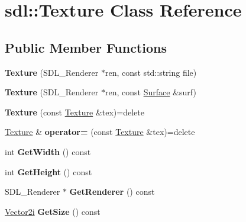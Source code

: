 \hypertarget{classsdl_1_1Texture}{\section{sdl\-:\-:Texture Class Reference}
\label{classsdl_1_1Texture}
}
\subsection*{Public Member Functions}
\begin{DoxyCompactItemize}
\item 
\hypertarget{classsdl_1_1Texture_aafbb2d903a685ce2093468ae618ac08d}{{\bfseries Texture} (S\-D\-L\-\_\-\-Renderer $\ast$ren, const std\-::string file)}\label{classsdl_1_1Texture_aafbb2d903a685ce2093468ae618ac08d}

\item 
\hypertarget{classsdl_1_1Texture_aa611d232626f15699711bbd9f8621f97}{{\bfseries Texture} (S\-D\-L\-\_\-\-Renderer $\ast$ren, const \hyperlink{classsdl_1_1Surface}{Surface} \&surf)}\label{classsdl_1_1Texture_aa611d232626f15699711bbd9f8621f97}

\item 
\hypertarget{classsdl_1_1Texture_a9ef8fc4562712b6b4bc8e3b54bd7a66b}{{\bfseries Texture} (const \hyperlink{classsdl_1_1Texture}{Texture} \&tex)=delete}\label{classsdl_1_1Texture_a9ef8fc4562712b6b4bc8e3b54bd7a66b}

\item 
\hypertarget{classsdl_1_1Texture_a55c8e99d500b331a0ad4e5e97c1b2cfc}{\hyperlink{classsdl_1_1Texture}{Texture} \& {\bfseries operator=} (const \hyperlink{classsdl_1_1Texture}{Texture} \&tex)=delete}\label{classsdl_1_1Texture_a55c8e99d500b331a0ad4e5e97c1b2cfc}

\item 
\hypertarget{classsdl_1_1Texture_af59bd68b996858bde68cb5cbb08e30fe}{int {\bfseries Get\-Width} () const }\label{classsdl_1_1Texture_af59bd68b996858bde68cb5cbb08e30fe}

\item 
\hypertarget{classsdl_1_1Texture_a53a9ba9261c1f309d814a0a5af42a107}{int {\bfseries Get\-Height} () const }\label{classsdl_1_1Texture_a53a9ba9261c1f309d814a0a5af42a107}

\item 
\hypertarget{classsdl_1_1Texture_a0167d59afbd3ad3c11fa289285670ddf}{S\-D\-L\-\_\-\-Renderer $\ast$ {\bfseries Get\-Renderer} () const }\label{classsdl_1_1Texture_a0167d59afbd3ad3c11fa289285670ddf}

\item 
\hypertarget{classsdl_1_1Texture_adfc0037b99bb9b0926cc84219affd5d4}{\hyperlink{classsdl_1_1Vector2}{Vector2i} {\bfseries Get\-Size} () const }\label{classsdl_1_1Texture_adfc0037b99bb9b0926cc84219affd5d4}

\end{DoxyCompactItemize}
